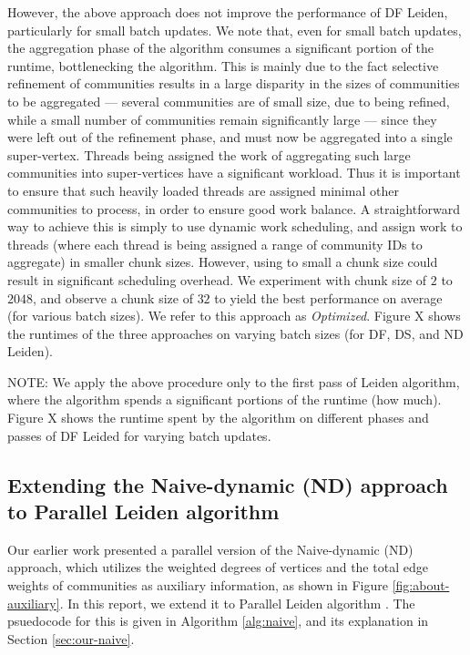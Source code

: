 However, the above approach does not improve the performance of DF Leiden, particularly for small batch updates. We note that, even for small batch updates, the aggregation phase of the algorithm consumes a significant portion of the runtime, bottlenecking the algorithm. This is mainly due to the fact selective refinement of communities results in a large disparity in the sizes of communities to be aggregated --- several communities are of small size, due to being refined, while a small number of communities remain significantly large --- since they were left out of the refinement phase, and must now be aggregated into a single super-vertex. Threads being assigned the work of aggregating such large communities into super-vertices have a significant workload. Thus it is important to ensure that such heavily loaded threads are assigned minimal other communities to process, in order to ensure good work balance. A straightforward way to achieve this is simply to use dynamic work scheduling, and assign work to threads (where each thread is being assigned a range of community IDs to aggregate) in smaller chunk sizes. However, using to small a chunk size could result in significant scheduling overhead. We experiment with chunk size of $2$ to $2048$, and observe a chunk size of $32$ to yield the best performance on average (for various batch sizes). We refer to this approach as \textit{Optimized}. Figure X shows the runtimes of the three approaches on varying batch sizes (for DF, DS, and ND Leiden).

NOTE: We apply the above procedure only to the first pass of Leiden algorithm, where the algorithm spends a significant portions of the runtime (how much). Figure X shows the runtime spent by the algorithm on different phases and passes of DF Leided for varying batch updates.


\subsection{Extending the Naive-dynamic (ND) approach to Parallel Leiden algorithm}

Our earlier work \cite{sahu2024dflouvain} presented a parallel version of the Naive-dynamic (ND) approach, which utilizes the weighted degrees of vertices and the total edge weights of communities as auxiliary information, as shown in Figure \ref{fig:about-auxiliary}. In this report, we extend it to Parallel Leiden algorithm \cite{sahu2023gveleiden}. The psuedocode for this is given in Algorithm \ref{alg:naive}, and its explanation in Section \ref{sec:our-naive}.

